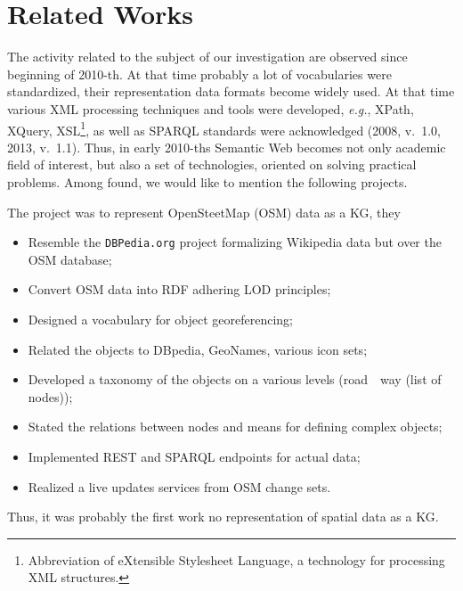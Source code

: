 \documentclass[
]{ceurart}
\begin{document}
\section{Related Works}

The activity related to the subject of our investigation are observed since beginning of 2010-th.  At that time probably a lot of vocabularies were standardized, their representation data formats become widely used.  At that time various XML processing techniques and tools were developed, \emph{e.g.}, XPath, XQuery, XSL\footnote{Abbreviation of eXtensible Stylesheet Language, a technology for processing XML structures.}, as well as SPARQL standards were acknowledged (2008, v.~1.0, 2013, v.~1.1).  Thus, in early 2010-ths Semantic Web becomes not only academic field of interest, but also a set of technologies, oriented on solving practical problems.  Among found, we would like to mention the following projects.

  The project \cite{lgd} was to represent OpenSteetMap (OSM) data as a KG, they
  \begin{itemize}
  \item Resemble the \texttt{DBPedia.org} project formalizing Wikipedia data but over the OSM database;
  \item Convert OSM data into RDF adhering LOD principles;
  \item Designed a vocabulary for object georeferencing;
  \item Related the objects to DBpedia, GeoNames, various icon sets;
  \item Developed a taxonomy of the objects on a various levels (road~\to~way (list of nodes)); %
  \item Stated the relations between nodes and means for defining complex objects;
  \item Implemented REST and SPARQL endpoints for actual data;
  \item Realized a live updates services from OSM change sets.
  \end{itemize}
  Thus, it was probably the first work no representation of spatial data as a KG.
\end{document}
